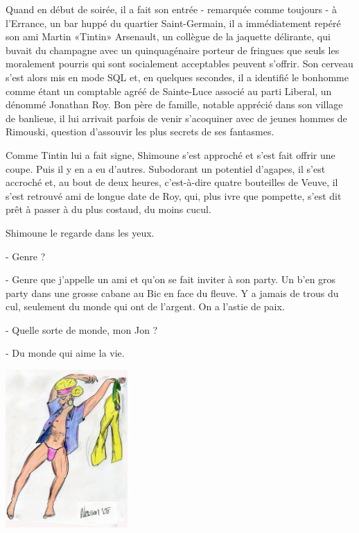 Quand en début de soirée, il a fait son entrée - remarquée comme toujours - à l’Errance, un bar huppé du quartier Saint-Germain, il a immédiatement repéré son ami Martin «Tintin» Arsenault, un collègue de la jaquette délirante, qui buvait du champagne avec un quinquagénaire porteur de fringues que seuls les moralement pourris qui sont socialement acceptables peuvent s’offrir. Son cerveau s’est alors mis en mode SQL et, en quelques secondes, il a identifié le bonhomme comme étant un comptable agréé de Sainte-Luce associé au parti Liberal, un dénommé Jonathan Roy. Bon père de famille, notable apprécié dans son village de banlieue, il lui arrivait parfois de venir s’acoquiner avec de jeunes hommes de Rimouski, question d’assouvir les plus secrets de ses fantasmes.

Comme Tintin lui a fait signe, Shimoune s’est approché et s’est fait offrir une coupe. Puis il y en a eu d’autres. Subodorant un potentiel d’agapes, il s’est accroché et, au bout de deux heures, c’est-à-dire quatre bouteilles de Veuve, il s’est retrouvé ami de longue date de Roy, qui, plus ivre que pompette, s’est dit prêt à passer à du plus costaud, du moins cucul.

Shimoune le regarde dans les yeux.

- Genre ?

- Genre que j’appelle un ami et qu’on se fait inviter à son party. Un b’en gros party dans une grosse cabane au Bic en face du fleuve. Y a jamais de trous du cul, seulement du monde qui ont de l’argent. On a l’astie de paix.

- Quelle sorte de monde, mon Jon ?

- Du monde qui aime la vie.

\begin{floatingfigure}[l]{50mm}
\includegraphics[height=60mm]{corps/chapitre13/img/personnage-simonstrip.jpg}
\end{floatingfigure}

